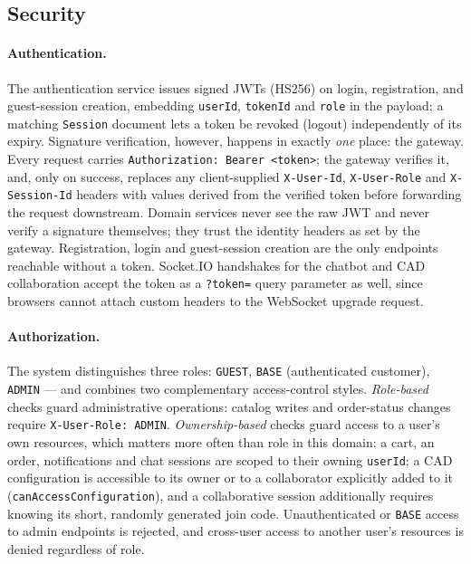 \subsection{Security}\label{security}

\paragraph{Authentication.} The authentication service issues signed JWTs
(HS256) on login, registration, and guest-session creation, embedding
\texttt{userId}, \texttt{tokenId} and \texttt{role} in the payload; a matching
\texttt{Session} document lets a token be revoked
(logout) independently of its expiry. Signature verification, however,
happens in exactly \emph{one} place: the gateway. Every request carries
\texttt{Authorization: Bearer <token>}; the gateway verifies it, and, only
on success, replaces any client-supplied \texttt{X-User-Id},
\texttt{X-User-Role} and \texttt{X-Session-Id} headers with values derived
from the verified token before forwarding the request downstream.
Domain services never see the raw JWT and never verify a
signature themselves; they trust the identity headers as set by the gateway.
Registration, login and guest-session
creation are the only endpoints reachable without a token. Socket.IO
handshakes for the chatbot and CAD collaboration accept the token as a
\texttt{?token=} query parameter as well, since browsers cannot attach custom
headers to the WebSocket upgrade request.

\paragraph{Authorization.} The system distinguishes three roles:
\texttt{GUEST}, \texttt{BASE} (authenticated customer), \texttt{ADMIN} --- and
combines two complementary access-control styles. \emph{Role-based} checks
guard administrative operations: catalog writes and order-status changes
require \texttt{X-User-Role: ADMIN}. \emph{Ownership-based} checks guard access to a user's
own resources, which matters more often than role in this domain: a cart,
an order, notifications and chat sessions are scoped to their owning
\texttt{userId}; a CAD configuration is accessible to its owner or to a
collaborator explicitly added to it (\texttt{canAccessConfiguration}), and a
collaborative session additionally requires knowing its short, randomly
generated join code. Unauthenticated or
\texttt{BASE} access to admin endpoints is rejected, and cross-user access to
another user's resources is denied regardless of role.

